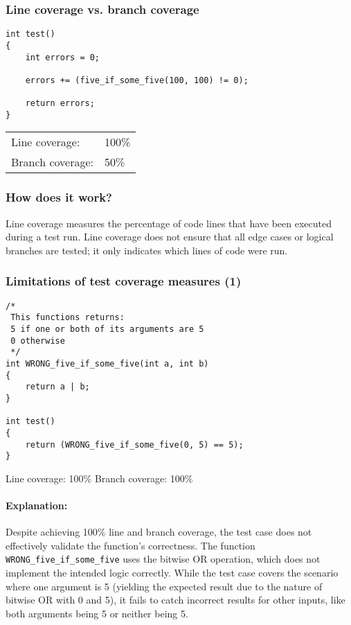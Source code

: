 \documentclass[12pt]{article}
\begin{document}
\subsubsection{Line coverage vs. branch coverage}

\begin{lstlisting}
int test()
{
    int errors = 0;

    errors += (five_if_some_five(100, 100) != 0);

    return errors;
}
\end{lstlisting}

\begin{tabular}{ l l }
Line coverage: & 100\% \\
Branch coverage: & 50\%
\end{tabular}
\subsubsection{How does it work?}
Line coverage measures the percentage of code lines that have been executed during a test run. Line coverage does not ensure that all edge cases or logical branches are tested; it only indicates which lines of code were run.

\subsubsection{Limitations of test coverage measures (1)}
\begin{lstlisting}
/*
 This functions returns:
 5 if one or both of its arguments are 5
 0 otherwise
 */
int WRONG_five_if_some_five(int a, int b)
{
    return a | b;
}

int test()
{
    return (WRONG_five_if_some_five(0, 5) == 5);
}
\end{lstlisting}

Line coverage: 100\%
Branch coverage: 100\%
\paragraph{Explanation:}
Despite achieving 100\% line and branch coverage, the test case does not effectively validate the function's correctness. The function \texttt{WRONG\_five\_if\_some\_five} uses the bitwise OR operation, which does not implement the intended logic correctly. While the test case covers the scenario where one argument is 5 (yielding the expected result due to the nature of bitwise OR with 0 and 5), it fails to catch incorrect results for other inputs, like both arguments being 5 or neither being 5.
\end{document}
